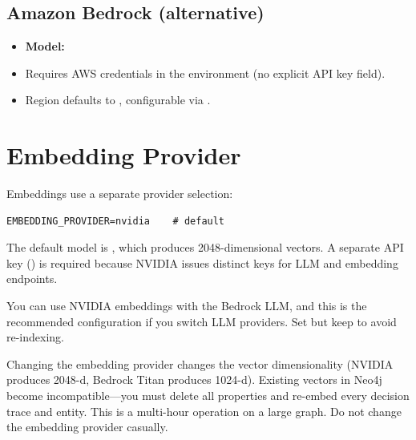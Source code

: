 \subsection*{Amazon Bedrock (alternative)}

\begin{itemize}
    \item \textbf{Model:} 
    \item Requires AWS credentials in the environment (no explicit API key field).
    \item Region defaults to , configurable via
          .
\end{itemize}


\section{Embedding Provider}
\label{sec:embedding-provider}

Embeddings use a separate provider selection:

\begin{lstlisting}[style=bash, numbers=none]
EMBEDDING_PROVIDER=nvidia    # default
\end{lstlisting}

The default model is , which produces
2048-dimensional vectors.  A separate API key ()
is required because NVIDIA issues distinct keys for LLM and embedding endpoints.

\begin{keyinsight}
You can use NVIDIA embeddings with the Bedrock LLM, and this is the recommended
configuration if you switch LLM providers.  Set  but
keep  to avoid re-indexing.
\end{keyinsight}

\begin{warning}
Changing the embedding provider changes the vector dimensionality (NVIDIA
produces 2048-d, Bedrock Titan produces 1024-d).  Existing vectors in Neo4j
become incompatible---you must delete all  properties and re-embed
every decision trace and entity.  This is a multi-hour operation on a large
graph.  Do not change the embedding provider casually.
\end{warning}


